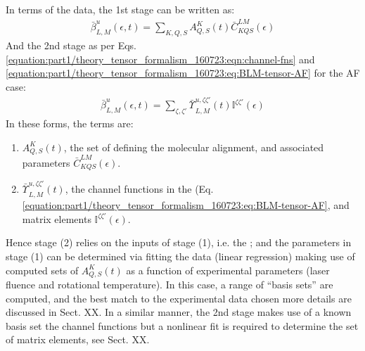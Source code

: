 \documentclass[letterpaper,table,10pt,english]{jupyterBook}
\begin{document}
\sphinxAtStartPar
In terms of the data, the 1st stage can be written as:
\begin{equation}\label{equation:part1/numerics_070723:eqn:beta-convolution-C}
\begin{split}
\bar{\beta}_{L,M}^{u}(\epsilon,t)=\sum_{K,Q,S}A_{Q,S}^{K}(t)\bar{C}_{KQS}^{LM}(\epsilon)
\end{split}
\end{equation}
\sphinxAtStartPar
And the 2nd stage as per Eqs. \eqref{equation:part1/theory_tensor_formalism_160723:eqn:channel-fns} and \eqref{equation:part1/theory_tensor_formalism_160723:eq:BLM-tensor-AF} for the AF case:
\begin{equation*}
\begin{split}
\bar{\beta}_{L,M}^{u}(\epsilon,t)=\sum_{\zeta,\zeta'}\bar{\varUpsilon_{}}_{L,M}^{u,\zeta\zeta'}(t)\mathbb{I}^{\zeta\zeta'}(\epsilon)
\end{split}
\end{equation*}
\sphinxAtStartPar
In these forms, the terms are:
\begin{enumerate}
%
\item {} 
\sphinxAtStartPar
\(A_{Q,S}^{K}(t)\), the set of {\hyperref[\detokenize{backmatter/glossary:term-ADMs}]{}} defining the molecular alignment, and associated parameters \(\bar{C}_{KQS}^{LM}(\epsilon)\).

\item {} 
\sphinxAtStartPar
\(\bar{\varUpsilon_{}}_{L,M}^{u,\zeta\zeta'}(t)\), the channel functions in the {\hyperref[\detokenize{backmatter/glossary:term-AF}]{}} (Eq. \eqref{equation:part1/theory_tensor_formalism_160723:eq:BLM-tensor-AF}, and matrix elements \(\mathbb{I}^{\zeta\zeta'}(\epsilon)\).

\end{enumerate}

\sphinxAtStartPar
Hence stage (2) relies on the inputs of stage (1), i.e. the {\hyperref[\detokenize{backmatter/glossary:term-ADMs}]{}}; and the parameters in stage (1) can be determined via fitting the data (linear regression) making use of computed sets of \(A_{Q,S}^{K}(t)\) as a function of experimental parameters (laser fluence and rotational temperature). In this case, a range of {\hyperref[\detokenize{backmatter/glossary:term-ADMs}]{}} “basis sets” are computed, and the best match to the experimental data chosen \sphinxhyphen{} more details are discussed in Sect. XX. In a similar manner, the 2nd stage makes use of a known basis set \sphinxhyphen{} the channel functions \sphinxhyphen{} but a non\sphinxhyphen{}linear fit is required to determine the set of matrix elements, see Sect. XX.
\end{document}
